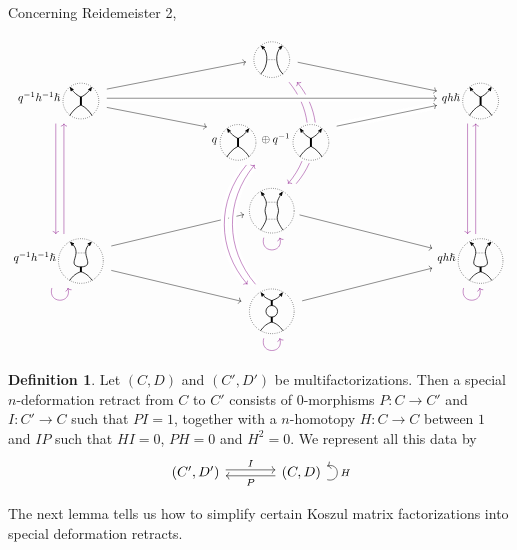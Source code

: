 \documentclass{article}
\newcommand{\sdr}[5]{%
  \begin{tikzcd}[column sep=large, ampersand replacement=\&]
    {#1} \arrow[r, "#3", shift left=0.5ex,] \arrow[r, leftarrow, "#4", shift right=0.5ex, swap] \& 
    {#2} \arrow[loop right, distance=1em, in=15, out=-15, "#5",swap]
  \end{tikzcd}%
}
\theoremstyle{plain} %
\theoremstyle{definition} %
\newtheorem{definition}[theorem]{Definition}
\theoremstyle{remark} %
\begin{document}
Concerning Reidemeister 2,

\[\label{r2sdr}
\begin{tikzcd}[row sep=-0.1cm, column sep=3cm]
& 
\scalebox{0.7}{\ThinEdge{}{}{}{}}
\arrow[dr]
\arrow[ddd, bend left=40, color=violet, shift right=1.5, dash pattern=on 40pt off 35pt]
\arrow[leftarrow, ddd, bend left=40, color=violet, shift left=1.5, dash pattern=on 39.5pt off 37pt]
&
\\
q^{-1}h^{-1}\hslash\scalebox{0.7}{\ThickEdge{}{}{}{}} 
\arrow[dr]
\arrow[ur]
\arrow[ddd, color=violet, shift right=1.5]
&
&
qh\hslash\scalebox{0.7}{\ThickEdge{}{}{}{}}
\arrow[ddd, color=violet, shift right=1.5]
\\
& 
q\scalebox{0.7}{\ThickEdge{}{}{}{}}\oplus q^{-1}\scalebox{0.7}{\ThickEdge{}{}{}{}}
\arrow[ur, crossing over] 
&
\\[2em]
& 
\scalebox{0.7}{\ThinThin{}{}{}{}{}}
\arrow[loop right, distance=1.5em, in=-75, out=-105, color=violet]
\arrow[dr]
&
\\
q^{-1}h^{-1}\hslash\scalebox{0.7}{\ThinThick{}{}{}{}{}} 
\arrow[loop right, distance=1.5em, in=-75, out=-105, color=violet]
\arrow[ur]
\arrow[dr]
\arrow[uuu, color=violet, shift right=1.5]
&& 
qh\hslash\scalebox{0.7}{\ThinThick{}{}{}{}{}}
\arrow[uuu, color=violet, shift right=1.5]
\arrow[loop right, distance=1.5em, in=-75, out=-105, color=violet]
\\
& 
\scalebox{0.7}{\Bigon{}{}{}{}{}} 
\arrow[ur]
\arrow[loop right, distance=1.5em, in=-75, out=-105, color=violet] 
&
\arrow[ddd, from=3-2, to=6-2, bend right=40, crossing over, color=violet, shift right=1.5] 
\arrow[uuu, from=6-2, to=3-2, bend left=40, crossing over, color=violet, shift right=1.5] 
\arrow[ur, from=3-2, to=2-3, crossing over] 
\arrow[rr, from=2-1, to=2-3, crossing over] 
\end{tikzcd}
\]


\begin{definition}
Let $(C,D)$ and $(C',D')$ be multifactorizations. Then a special $n$-deformation retract from $C$ to $C'$ consists of 0-morphisms $P:C\to C'$ and $I:C'\to C$ such that $PI=1$, together with a $n$-homotopy $H:C\to C$ between $1$ and $IP$ such that $HI=0$, $PH=0$ and $H^2=0$. We represent all this data by
$$\sdr{(C',D')}{(C,D)}{I}{P}{H}$$
\end{definition}

The next lemma tells us how to simplify certain Koszul matrix factorizations into special deformation retracts.
\end{document}
